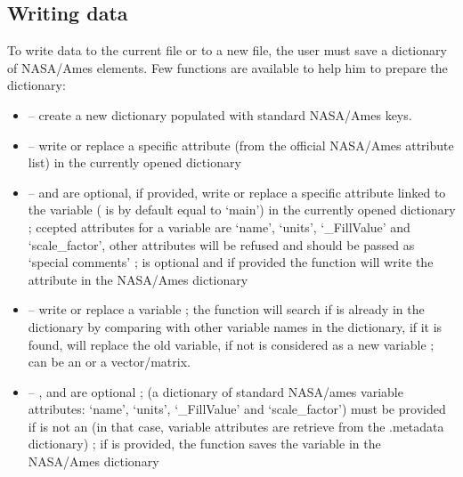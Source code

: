 \documentclass[a4paper,10pt,openany,english]{sphinxmanual}
\begin{document}
\subsection{Writing data}
\label{tutorial:id16}
To write data to the current file or to a new file, the user must save a dictionary of NASA/Ames elements. Few functions are available to help him to prepare the dictionary:
\begin{itemize}
\item {} 
 -- create a new dictionary populated with standard NASA/Ames keys.

\item {} 
 -- write or replace a specific attribute (from the official NASA/Ames attribute list) in the currently opened dictionary

\item {} 
 --  and  are optional, if provided, write or replace a specific attribute linked to the variable  ( is by default equal to `main') in the currently opened dictionary ; ccepted attributes for a variable are `name', `units', `\_FillValue' and `scale\_factor', other attributes will be refused and should be passed as `special comments' ;  is optional and if provided the function will write the attribute in the NASA/Ames dictionary 

\item {} 
 -- write or replace a variable ; the function will search if  is already in the dictionary by comparing  with other variable names in the dictionary, if it is found,  will replace the old variable, if not  is considered as a new variable ;  can be an {\hyperref[egadsapi:egads.core.egads_core.EgadsData]{}} or a vector/matrix.

\item {} 
 -- ,  and  are optional ;  (a dictionary of standard NASA/ames variable attributes: `name', `units', `\_FillValue' and `scale\_factor') must be provided if  is not an {\hyperref[egadsapi:egads.core.egads_core.EgadsData]{}} (in that case, variable attributes are retrieve from the {\hyperref[egadsapi:egads.core.egads_core.EgadsData]{}}.metadata dictionary) ; if  is provided, the function saves the variable in the NASA/Ames dictionary 

\end{itemize}
\end{document}
